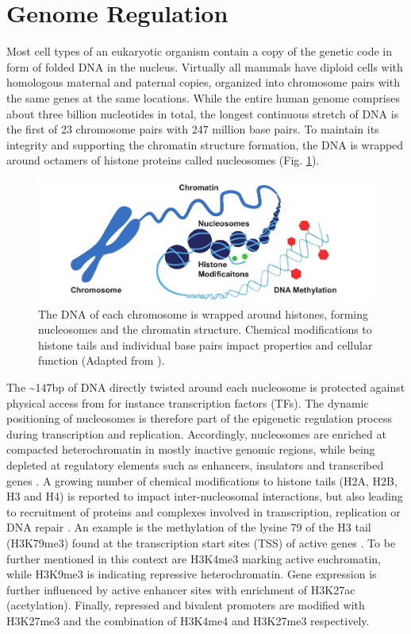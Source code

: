 \section{Genome Regulation}
\label{sec:intro:bio}

Most cell types of an eukaryotic organism contain a copy of the genetic code in form of folded DNA in the nucleus.
Virtually all mammals have diploid cells with homologous maternal and paternal copies, organized into chromosome pairs with the same genes at the same locations.
While the entire human genome comprises about three billion nucleotides in total, the longest continuous stretch of DNA is the first of 23 chromosome pairs with 247 million base pairs. 
To maintain its integrity and supporting the chromatin structure formation, the DNA is wrapped around octamers of histone proteins called nucleosomes (Fig. \ref{fig:intro:chromatin}).


\begin{figure}[h]
	\centering
	\includegraphics[width=1.0\textwidth]{figures/intro/chromatin.pdf}
	\captionsetup{format=plain}
	\caption[Chromosome to nucleotide structure]{The DNA of each chromosome is wrapped around histones, forming nucleosomes and the chromatin structure. Chemical modifications to histone tails and individual base pairs impact properties and cellular function (Adapted from \cite{zymo2020}).}
	\label{fig:intro:chromatin}
\end{figure}

The \textasciitilde 147bp of DNA directly twisted around each nucleosome is protected against physical access from for instance transcription factors (TFs). 
The dynamic positioning of nucleosomes is therefore part of the epigenetic regulation process during transcription and replication.
Accordingly, nucleosomes are enriched at compacted heterochromatin in mostly inactive genomic regions, while being depleted at regulatory elements such as enhancers, insulators and transcribed genes \cite{Klemm2019}. 
A growing number of chemical modifications to histone tails (H2A, H2B, H3 and H4) is reported to impact inter-nucleosomal interactions, but also leading to recruitment of proteins and complexes involved in transcription, replication or DNA repair \cite{Bannister2011}. 
An example is the methylation of the lysine 79 of the H3 tail (H3K79me3) found at the transcription start sites (TSS) of active genes \cite{Lawrence2016}. 
To be further mentioned in this context are H3K4me3 marking active euchromatin, while H3K9me3 is indicating repressive heterochromatin.
Gene expression is further influenced by active enhancer sites with enrichment of H3K27ac (acetylation).
Finally, repressed and bivalent promoters are modified with H3K27me3 and the combination of H3K4me4 and H3K27me3 respectively.



